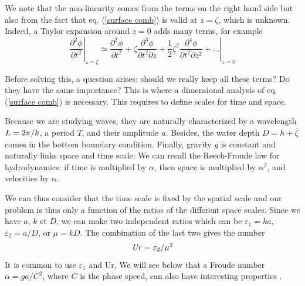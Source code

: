 We note that the non-linearity comes from the terms on the right hand side but also from the fact that  eq. (\ref{surface comb}) 
is valid  at $z=\zeta$, which is unknown. Indeed,  a Taylor expansion around $z=0$ adds many terms, for example 
\begin{equation}
\left. \frac{\partial^2{\phi}}{\partial{t^2}} \right|_{z=\zeta} \simeq \left. \frac{\partial^2{\phi}}{\partial{t^2}} + \zeta \frac{\partial^3{\phi}}{\partial{t^2} \partial z}  
+ \frac{1}{2}\zeta^2 \frac{\partial^4{\phi}}{\partial{t^2} \partial z^2} + ...  \right|_{z=0}
\end{equation}


Before solving this, a question arises: should we really keep all these terms? Do they have the same importance?  This is where a dimensional 
analysis of  eq. (\ref{surface comb}) is necessary. This requires to define scales for time and space. 

Because we are studying waves, they are naturally characterized by a wavelength  $L=2 \pi/k$, a period $T$, and their amplitude $a$. 
Besides, the water depth  $D=h+\overline{\zeta}$
comes in the bottom boundary condition. Finally, gravity 
$g$ is constant and naturally links space and time scale. We can recall the Reech-Froude law for hydrodynamics: if time is multiplied by  $\alpha$,
then space is multiplied by  $\alpha^2$, and velocities by  $\alpha$.

We can thus consider that the time scale is fixed by the spatial scale and our problem is thus only a function of the 
ratios of the different space scales. Since we have  $a$, $k$ et $D$, we can make two independent ratios which can be  $\varepsilon_1= k a$,
 $\varepsilon_2= a/D$, or $\mu=kD$. The combination of the last two gives the \cite{Ursell1953} number  
 \begin{equation}
\mbox{\textit{Ur}}=\varepsilon_2/\mu^2
 \end{equation}
It is common to use  $\varepsilon_1$ and
$\mathrm{Ur}$. We will see below that a Froude number $\alpha=g a /
C^2$, where $C$ is the phase speed, can also have interesting properties \citep{Kirby1998}.


